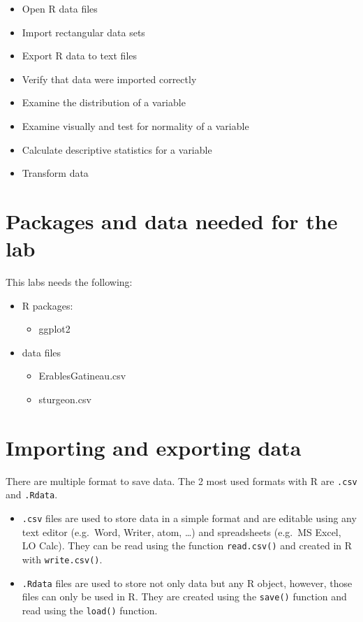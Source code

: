 \documentclass[
  12pt,
]{book}
\providecommand{\tightlist}{%
  \setlength{\itemsep}{0pt}\setlength{\parskip}{0pt}}
\begin{document}
\begin{itemize}
\tightlist
\item
  Open R data files
\item
  Import rectangular data sets
\item
  Export R data to text files
\item
  Verify that data were imported correctly
\item
  Examine the distribution of a variable
\item
  Examine visually and test for normality of a variable
\item
  Calculate descriptive statistics for a variable
\item
  Transform data
\end{itemize}

\hypertarget{set-intro}{%
\section{Packages and data needed for the lab}\label{set-intro}}

This labs needs the following:

\begin{itemize}
\tightlist
\item
  R packages:

  \begin{itemize}
  \tightlist
  \item
    ggplot2
  \end{itemize}
\item
  data files

  \begin{itemize}
  \tightlist
  \item
    ErablesGatineau.csv
  \item
    sturgeon.csv
  \end{itemize}
\end{itemize}

\hypertarget{importing-and-exporting-data}{%
\section{Importing and exporting data}\label{importing-and-exporting-data}}

There are multiple format to save data. The 2 most used formats with R are \texttt{.csv} and \texttt{.Rdata}.

\begin{itemize}
\tightlist
\item
  \texttt{.csv} files are used to store data in a simple format and are editable using any text editor (e.g.~Word, Writer, atom, \ldots) and spreadsheets (e.g.~MS Excel, LO Calc).
  They can be read using the function \texttt{read.csv()} and created in R with \texttt{write.csv()}.
\item
  \texttt{.Rdata} files are used to store not only data but any R object, however, those files can only be used in R. They are created using the \texttt{save()} function and read using the \texttt{load()} function.
\end{itemize}
\end{document}
